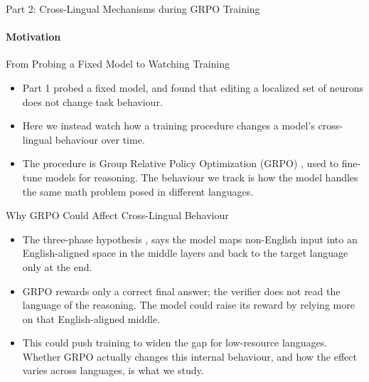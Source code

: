 \documentclass[aspectratio=169]{beamer}
\begin{document}
	\begin{frame}{Part 2: Cross-Lingual Mechanisms during GRPO Training}
		\framesubtitle{Motivation}
		\begin{block}{\scriptsize From Probing a Fixed Model to Watching Training}\scriptsize
			\begin{itemize}
				\item Part 1 probed a fixed model, and found that editing a localized set of neurons does not change task behaviour.
				\item Here we instead watch how a training procedure changes a model's cross-lingual behaviour over time.
				\item The procedure is Group Relative Policy Optimization (GRPO) \autocite{shao2024deepseekmath}, used to fine-tune models for reasoning. The behaviour we track is how the model handles the same math problem posed in different languages.
			\end{itemize}
		\end{block}
		\begin{block}{\scriptsize Why GRPO Could Affect Cross-Lingual Behaviour}\scriptsize
			\begin{itemize}
				\item The three-phase hypothesis \autocite{wendler2024llamas}, says the model maps non-English input into an English-aligned space in the middle layers and back to the target language only at the end.
				\item GRPO rewards only a correct final answer; the verifier does not read the language of the reasoning. The model could raise its reward by relying more on that English-aligned middle.
				\item This could push training to widen the gap for low-resource languages. Whether GRPO actually changes this internal behaviour, and how the effect varies across languages, is what we study.
			\end{itemize}
		\end{block}
	\end{frame}
	
\end{document}
